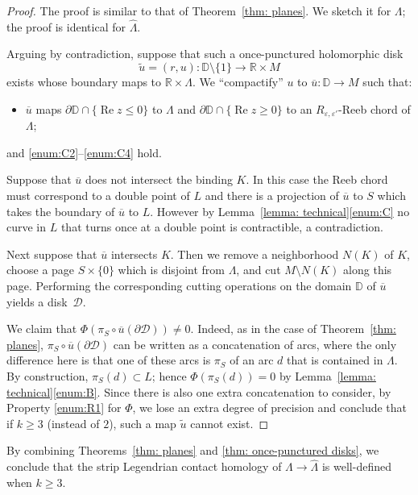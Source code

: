 \documentclass[10pt]{amsart}
\let\mathcal\mathscr
\let\ra\rightarrow
\theoremstyle{plain}
\theoremstyle{definition}
\numberwithin{equation}{subsection}
\newcommand{\RR}{\mathbb{R}}
\newcommand{\bdry}{\partial}
\let\op\operatorname
\begin{document}
\begin{proof}
The proof is similar to that of Theorem~\ref{thm: planes}. We sketch it for $\Lambda$; the proof is identical for $\widehat{\Lambda}$.

Arguing by contradiction, suppose that such a once-punctured holomorphic disk
$$\widetilde u=(r,u): \mathbb{D}\setminus \{1\}\to \RR\times M$$
exists whose boundary maps to $\RR\times \Lambda$. We ``compactify'' $u$ to $\overline{u}: \mathbb{D}\to M$
such that:
\begin{itemize}
\item[(C1')] $\overline{u}$ maps $\bdry \mathbb{D} \cap \{\op{Re} z\leq 0\}$ to $\Lambda$ and $\bdry\mathbb{D}\cap \{\op{Re} z\geq 0\}$ to an $R_{\varepsilon,\varepsilon'}$-Reeb chord of $\Lambda$;
\end{itemize}
and \eqref{enum:C2}--\eqref{enum:C4} hold.

Suppose that $\overline{u}$ does not intersect the binding $K$. In this case the Reeb chord must correspond to a double point of $L$ and there is a projection of $\overline{u}$ to $S$ which takes the boundary of $\overline{u}$ to $L$. However by Lemma~\ref{lemma: technical}\eqref{enum:C} no curve in $L$ that turns once at a double point is contractible, a contradiction.

Next suppose that $\overline{u}$ intersects $K$. Then we remove a neighborhood $N(K)$ of $K$, choose a page $S\times\{0\}$ which is disjoint from $\Lambda$, and cut $M\setminus N(K)$ along this page. Performing the corresponding cutting operations on the domain $\mathbb{D}$ of $\overline{u}$ yields a disk~$\mathcal{D}$.

We claim that $\Phi(\pi_S\circ \overline{u}(\bdry \mathcal{D}))\not=0$. Indeed, as in the case of Theorem~\ref{thm: planes}, $\pi_S\circ \overline{u}(\bdry \mathcal{D})$ can be written as a concatenation of arcs, where the only difference here is that one of these arcs is $\pi_S$ of an arc $d$ that is contained in $\Lambda$. By construction, $\pi_S(d)\subset L$; hence $\Phi(\pi_S(d))=0$ by Lemma~\ref{lemma: technical}\eqref{enum:B}. Since there is also one extra concatenation to consider, by Property \eqref{enum:R1} for $\Phi$, we lose an extra degree of precision and conclude that if $k\geq 3$ (instead of $2$), such a map $\widetilde u$ cannot exist.
\end{proof}

By combining Theorems~\ref{thm: planes} and \ref{thm: once-punctured disks}, we conclude that the strip Legendrian contact homology of $\Lambda\ra \widehat{\Lambda}$ is well-defined when $k\geq 3$.
\end{document}
